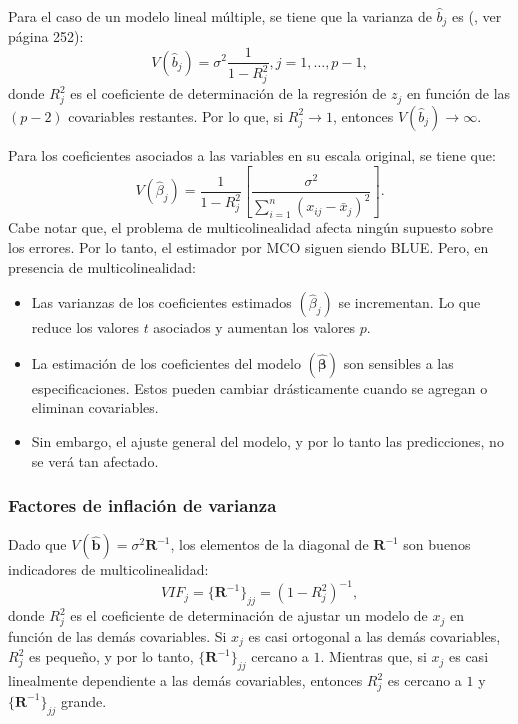\documentclass[
]{article}
\begin{document}
Para el caso de un modelo lineal múltiple, se tiene que la varianza de \(\widehat{b}_j\) es (\citet{seber_linear_2003}, ver página 252):
\[
V(\widehat{b}_j) = \sigma^{2} \frac{1}{1-R^{2}_j}, j=1,\ldots,p-1,
\]
donde \(R^{2}_{j}\) es el coeficiente de determinación de la regresión de \(z_{j}\) en función de las \((p-2)\) covariables restantes. Por lo que, si \(R^{2}_{j} \rightarrow 1\), entonces \(V(\widehat{b}_{j})\rightarrow \infty\).

Para los coeficientes asociados a las variables en su escala original, se tiene que:
\[
V(\widehat{\beta}_j) = \frac{1}{1-R^2_{j}} \left[ \frac{\sigma^2}{\sum_{i=1}^{n} (x_{ij} - \bar{x}_j)^2} \right].
\]
Cabe notar que, el problema de multicolinealidad afecta ningún supuesto sobre los errores. Por lo tanto, el estimador por MCO siguen siendo BLUE. Pero, en presencia de multicolinealidad:

\begin{itemize}
\item
  Las varianzas de los coeficientes estimados \((\widehat{\beta}_{j})\) se incrementan. Lo que reduce los valores \(t\) asociados y aumentan los valores \(p\).
\item
  La estimación de los coeficientes del modelo \((\widehat{\boldsymbol \beta})\) son sensibles a las especificaciones. Estos pueden cambiar drásticamente cuando se agregan o eliminan covariables.
\item
  Sin embargo, el ajuste general del modelo, y por lo tanto las predicciones, no se verá tan afectado.
\end{itemize}

\subsubsection{Factores de inflación de varianza}\label{factores-de-inflaciuxf3n-de-varianza}

Dado que \(V(\widehat{\boldsymbol b}) = \sigma^2\boldsymbol R^{-1}\), los elementos de la diagonal de \(\boldsymbol R^{-1}\) son buenos indicadores de multicolinealidad:
\[
VIF_j =\{\boldsymbol R^{-1}\}_{jj} = (1-R_{j}^{2})^{-1},
\]
donde \(R_{j}^{2}\) es el coeficiente de determinación de ajustar un modelo de \(x_{j}\) en función de las demás covariables. Si \(x_{j}\) es casi ortogonal a las demás covariables, \(R^{2}_{j}\) es pequeño, y por lo tanto, \(\{\boldsymbol R^{-1}\}_{jj}\) cercano a \(1\). Mientras que, si \(x_{j}\) es casi linealmente dependiente a las demás covariables, entonces \(R^{2}_{j}\) es cercano a \(1\) y \(\{\boldsymbol R^{-1}\}_{jj}\) grande.
\end{document}
